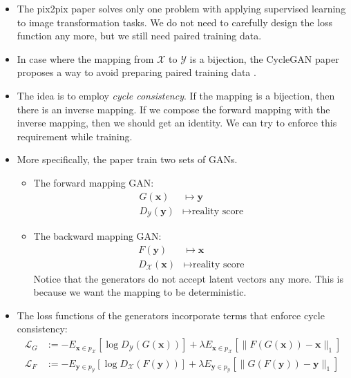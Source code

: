 \documentclass[10pt]{article}
\newcommand{\ve}[1]{\pmb{#1}}
\begin{document}
  \begin{itemize}
    \item The pix2pix paper solves only one problem with applying supervised learning to image transformation tasks. We do not need to carefully design the loss function any more, but we still need paired training data.

    \item In case where the mapping from $\mathcal{X}$ to $\mathcal{Y}$ is a bijection, the CycleGAN paper proposes a way to avoid preparing paired training data \cite{Zhu:2017}.

    \item The idea is to employ \emph{cycle consistency}. If the mapping is a bijection, then there is an inverse mapping. If we compose the forward mapping with the inverse mapping, then we should get an identity. We can try to enforce this requirement while training.

    \item More specifically, the paper train two sets of GANs.
    \begin{itemize}
      \item The forward mapping GAN:
      \begin{align*}
        G(\ve{x}) &\mapsto \ve{y} \\
        D_{\mathcal{Y}}(\ve{y}) &\mapsto \mbox{reality score}
      \end{align*}
      \item The backward mapping GAN:
      \begin{align*}
        F(\ve{y}) &\mapsto \ve{x} \\
        D_{\mathcal{X}}(\ve{x}) &\mapsto \mbox{reality score}
      \end{align*}
      Notice that the generators do not accept latent vectors any more. This is because we want the mapping to be deterministic.
    \end{itemize}

    \item The loss functions of the generators incorporate terms that enforce cycle consistency:
    \begin{align*}
      \mathcal{L}_{G} 
      &:= - E_{\ve{x} \in p_{\mathcal{X}}} [\log D_{\mathcal{Y}}(G(\ve{x}))] + \lambda E_{\ve{x} \in p_{\mathcal{X}}} [\| F(G(\ve{x})) - \ve{x} \|_1 ] \\
      \mathcal{L}_F
      &:= - E_{\ve{y} \in p_{\mathcal{Y}}} [\log D_{\mathcal{X}}(F(\ve{y}))] + \lambda E_{\ve{y} \in p_{\mathcal{Y}}} [\| G(F(\ve{y})) - \ve{y} \|_1 ]
    \end{align*}


\end{itemize}
\end{document}
